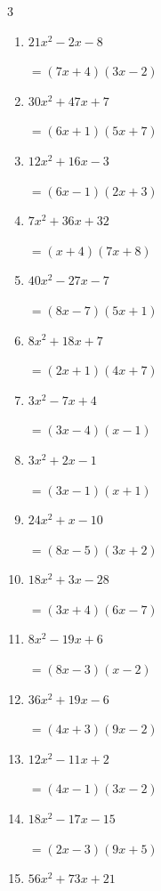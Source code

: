 \begin{multicols}{3}
\begin{enumerate}
\columnbreak %

\resetques

  \item $21x^{2}-2x-8$

        $=(7x+4)(3x-2)$

  \item $30x^{2}+47x+7$

        $=(6x+1)(5x+7)$

  \item $12x^{2}+16x-3$

        $=(6x-1)(2x+3)$

  \item $7x^{2}+36x+32$

        $=(x+4)(7x+8)$

  \item $40x^{2}-27x-7$

        $=(8x-7)(5x+1)$

  \item $8x^{2}+18x+7$

        $=(2x+1)(4x+7)$

  \item $3x^{2}-7x+4$

        $=(3x-4)(x-1)$

  \item $3x^{2}+2x-1$

        $=(3x-1)(x+1)$

  \item $24x^{2}+x-10$

        $=(8x-5)(3x+2)$

  \item $18x^{2}+3x-28$

        $=(3x+4)(6x-7)$

\columnbreak %

  \item $8x^{2}-19x+6$

        $=(8x-3)(x-2)$

  \item $36x^{2}+19x-6$

        $=(4x+3)(9x-2)$

  \item $12x^{2}-11x+2$

        $=(4x-1)(3x-2)$

  \item $18x^{2}-17x-15$

        $=(2x-3)(9x+5)$

  \item $56x^{2}+73x+21$


\end{enumerate}
\end{multicols}
